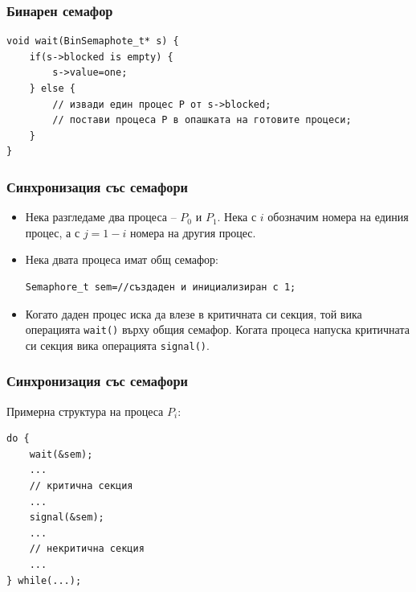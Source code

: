 \documentclass[ignorenonframetext, hyperref=unicode]{beamer}
\begin{document}
\begin{frame}[containsverbatim]
\frametitle{Бинарен семафор}
\begin{lstlisting}
void wait(BinSemaphote_t* s) {
	if(s->blocked is empty) {
		s->value=one;
	} else {
		// извади един процес P от s->blocked;
		// постави процеса P в опашката на готовите процеси;
	}
}
\end{lstlisting}
\end{frame}

\begin{frame}[containsverbatim]
\frametitle{Синхронизация със семафори}
\begin{itemize}
\item Нека разгледаме два процеса -- $P_0$ и $P_1$. Нека с $i$ обозначим
  номера на единия процес, а с $j=1-i$ номера на другия процес.
\item Нека двата процеса имат общ семафор:
\begin{lstlisting}[numbers=none]
Semaphore_t sem=//създаден и инициализиран с 1;
\end{lstlisting}
\item Когато даден процес иска да влезе в критичната си секция, той вика
операцията \lstinline{wait()} върху общия семафор. Когата процеса напуска
критичната си секция вика операцията \lstinline{signal()}.
\end{itemize}
\end{frame}


\begin{frame}[containsverbatim]
\frametitle{Синхронизация със семафори}
Примерна структура на процеса $P_i$:
\begin{lstlisting}[numbers=none]
do {
	wait(&sem); 
	...
	// критична секция
	...
	signal(&sem);
	...
	// некритична секция
	...
} while(...);
\end{lstlisting}
\end{frame}
\end{document}
